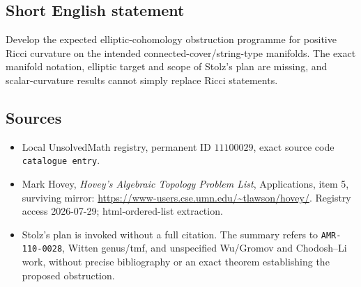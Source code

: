 \documentclass[11pt]{article}
\begin{document}
\subsection{Short English statement}
Develop the expected elliptic-cohomology obstruction programme for positive Ricci curvature on the intended connected-cover/string-type manifolds. The exact manifold notation, elliptic target and scope of Stolz's plan are missing, and scalar-curvature results cannot simply replace Ricci statements.
\subsection{Sources}
\begin{itemize}
\item Local UnsolvedMath registry, permanent ID \(11100029\), exact source code \texttt{catalogue entry}.
\item Mark Hovey, \emph{Hovey's Algebraic Topology Problem List}, Applications, item 5, surviving mirror: \url{https://www-users.cse.umn.edu/~tlawson/hovey/}. Registry access 2026-07-29; html-ordered-list extraction.
\item Stolz's plan is invoked without a full citation. The summary refers to \texttt{AMR-110-0028}, Witten genus/tmf, and unspecified Wu/Gromov and Chodosh--Li work, without precise bibliography or an exact theorem establishing the proposed obstruction.
\end{itemize}
\end{document}
